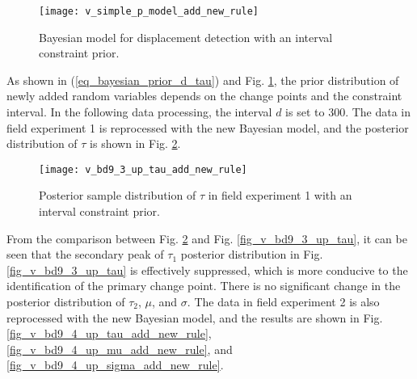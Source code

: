 \documentclass[journal]{IEEEtran}
\begin{document}
\begin{figure}[H]
	\centering
	\texttt{[image: v\_simple\_p\_model\_add\_new\_rule]}
	\caption{Bayesian model for displacement detection with an interval constraint prior.}
	\label{fig_v_simple_p_model_add_new_rule}
\end{figure} 
As shown in (\ref{eq_bayesian_prior_d_tau}) and Fig. \ref{fig_v_simple_p_model_add_new_rule}, the prior distribution of newly added random variables depends on the change points and the constraint interval. 
In the following data processing, the interval $d$ is set to 300.
The data in field experiment 1 is reprocessed with the new Bayesian model, and the posterior distribution of $\tau$ is shown in Fig. \ref{fig_v_bd9_3_up_tau_add_new_rule}.

\begin{figure}[htbp]
	\centering
	\texttt{[image: v\_bd9\_3\_up\_tau\_add\_new\_rule]}
	\caption{Posterior sample distribution of $\tau$ in field experiment 1 with an interval constraint prior.}
	\label{fig_v_bd9_3_up_tau_add_new_rule}
\end{figure} 

From the comparison between Fig. \ref{fig_v_bd9_3_up_tau_add_new_rule} and Fig. \ref{fig_v_bd9_3_up_tau}, it can be seen that the secondary peak of $\tau_1$ posterior distribution in Fig. \ref{fig_v_bd9_3_up_tau} is effectively suppressed, which is more conducive to the identification of the primary change point. 
There is no significant change in the posterior distribution of $\tau_2$, $\mu$, and  $\sigma$.
The data in field experiment 2 is also reprocessed with the new Bayesian model, and the results are shown in Fig. \ref{fig_v_bd9_4_up_tau_add_new_rule}, \ref{fig_v_bd9_4_up_mu_add_new_rule}, and \ref{fig_v_bd9_4_up_sigma_add_new_rule}.
\end{document}

